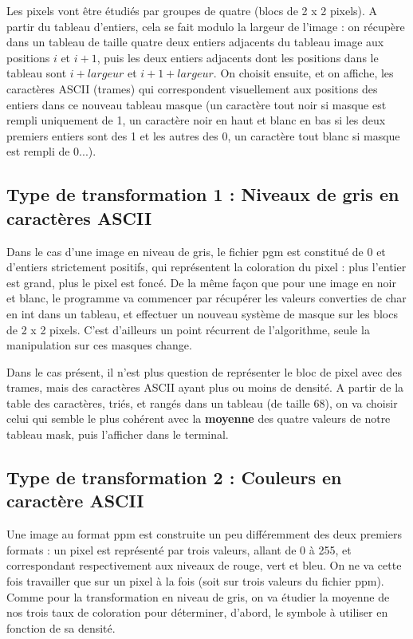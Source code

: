 \documentclass{article}
\begin{document}
Les pixels vont être étudiés par groupes de quatre (blocs de 2 x 2 pixels). A partir du tableau d'entiers, cela se fait modulo la largeur de l'image : on récupère dans un tableau de taille quatre deux entiers adjacents du tableau image aux positions $i$ et $i + 1$, puis les deux entiers adjacents dont les positions dans le tableau sont $i + largeur$ et $i + 1 + largeur$. On choisit ensuite, et on affiche, les caractères ASCII (trames) qui correspondent visuellement aux positions des entiers dans ce nouveau tableau masque (un caractère tout noir si masque est rempli uniquement de 1, un caractère noir en haut et blanc en bas si les deux premiers entiers sont des 1 et les autres des 0, un caractère tout blanc si masque est rempli de 0...).
\newline

\subsection{Type de transformation 1 : Niveaux de gris en caractères ASCII}
Dans le cas d'une image en niveau de gris, le fichier pgm est constitué de 0 et d'entiers strictement positifs, qui représentent la coloration du pixel : plus l'entier est grand, plus le pixel est foncé. De la même façon que pour une image en noir et blanc, le programme va commencer par récupérer les valeurs converties de char en int dans un tableau, et effectuer un nouveau système de masque sur les blocs de 2 x 2 pixels. C'est d'ailleurs un point récurrent de l'algorithme, seule la manipulation sur ces masques change.
\newline

Dans le cas présent, il n'est plus question de représenter le bloc de pixel avec des trames, mais des caractères ASCII ayant plus ou moins de densité. A partir de la table des caractères, triés, et rangés dans un tableau (de taille 68), on va choisir celui qui semble le plus cohérent avec la \textbf{moyenne} des quatre valeurs de notre tableau mask, puis l'afficher dans le terminal. 
\newline

\subsection{Type de transformation 2 : Couleurs en caractère ASCII}
Une image au format ppm est construite un peu différemment des deux premiers formats : un pixel est représenté par trois valeurs, allant de 0 à 255, et correspondant respectivement aux niveaux de rouge, vert et bleu. On ne va cette fois travailler que sur un pixel à la fois (soit sur trois valeurs du fichier ppm). Comme pour la transformation en niveau de gris, on va étudier la moyenne de nos trois taux de coloration pour déterminer, d'abord, le symbole à utiliser en fonction de sa densité. 
\newline
\end{document}
